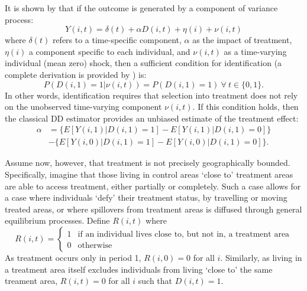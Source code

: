 \documentclass{article}
\begin{document}
\begin{spacing}{1.1}
It is shown by \citet{AshenfelterCard1985} that if the outcome is generated by
a component of variance process:
\begin{equation}
\label{Seqn:COV}
Y(i,t)=\delta(t) + \alpha D(i,t)+\eta(i)+\nu(i,t)
\end{equation}
where $\delta(t)$ refers to a time-specific component, $\alpha$ as the impact of 
treatment, $\eta(i)$ a component specific to each individual, and $\nu(i,t)$ as 
a time-varying individual (mean zero) shock, then a sufficient condition for 
identification (a complete derivation is provided by \citet{Abadie2005}) is:
\begin{equation}
\label{Seqn:ID}
P(D(i,1)=1|\nu(i,t))=P(D(i,1)=1) \ \forall\ t\in\{0,1\}.
\end{equation}
In other words, identification requires that selection into treatment does not
rely on the unobserved time-varying component $\nu(i,t)$.  If this condition 
holds, then the classical DD estimator provides an unbiased estimate of the
treatment effect:
\begin{equation}
\label{Seqn:DD}
\begin{split}
\alpha&=\{E[Y(i,1)|D(i,1)=1]-E[Y(i,1)|D(i,1)=0]\} \\
      &-\{E[Y(i,0)|D(i,1)=1]-E[Y(i,0)|D(i,1)=0]\}.
\end{split}
\end{equation}

Assume now, however, that treatment is not precisely geographically bounded.  
Specifically, imagine that those living in control areas `close to' treatment 
areas are able to access treatment, either partially or completely.  Such a 
case allows for a case where individuals `defy' their treatment status, by 
travelling or moving treated areas, or where spillovers from treatment areas 
is diffused through general equilibrium processes.  Define $R(i,t)$ where
\begin{equation}
 R(i,t) =
  \begin{cases}
   1   & \text{if an individual lives close to, but not in, a treatment area} \\
   0   & \text{otherwise} 
  \end{cases}
\end{equation}
As treatment occurs only in period 1, $R(i,0)=0$ for all $i$.  Similarly, as 
living in a treatment area itself excludes individuals from living `close to' 
the same treament area, $R(i,t)=0$ for all $i$ such that $D(i,t)=1$.


\end{spacing}
\end{document}
